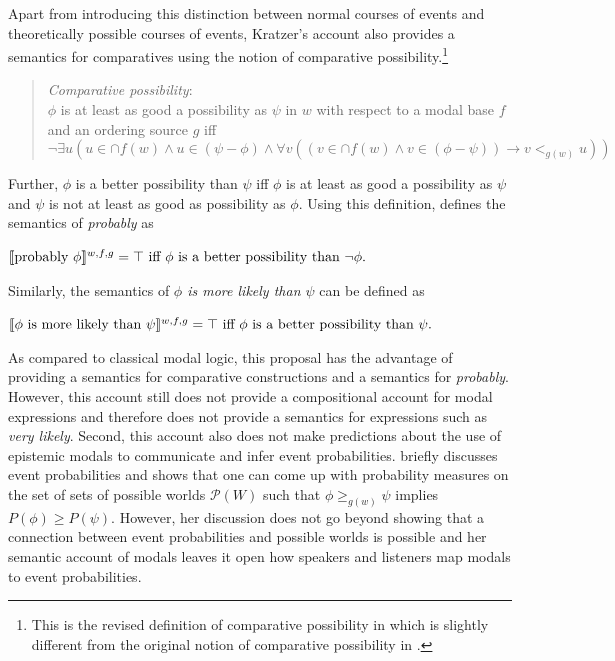 Apart from introducing this distinction between normal courses of events and theoretically possible courses of events, Kratzer's account also
provides a semantics for comparatives using the notion of comparative possibility.\footnote{This is the revised definition of comparative possibility
in \textcite[][Ch. 2]{Kratzer2012} which is slightly different from the original notion of comparative possibility in \textcite{Kratzer1981}.}
\begin{quote}
\noindent \textit{Comparative possibility}: \\
$\phi$ is at least as good a possibility as $\psi$ in $w$ with respect to a modal base $f$ and an ordering source $g$ iff 
$$\lnot \exists u ( u \in \cap f(w) \land u \in (\psi-\phi) \land \forall v (( v \in \cap f(w) \land v \in (\phi-\psi)) \rightarrow v <_{g(w)} u))$$
\end{quote}
\noindent	Further, $\phi$ is a better possibility than $\psi$ iff $\phi$ is at least as good a  possibility as $\psi$ and $\psi$ is 
not at least as good as possibility as $\phi$. Using this definition, \textcite{Kratzer1991} defines the semantics of \textit{probably} as
\begin{exe}
\ex $\llbracket\mbox{probably } \phi\rrbracket^{w,f,g}  = \top \mbox{ iff $\phi$ is a better possibility than $\lnot \phi$}.$ 
\end{exe}
\noindent Similarly, the semantics of \textit{$\phi$ is more likely than $\psi$} can be defined as 
\begin{exe}
\ex $\llbracket\phi \mbox{ is more likely than } \psi\rrbracket^{w,f,g}  = \top \mbox{ iff $\phi$ is a better possibility than $\psi$}.$ 
\end{exe}	

As compared to classical modal logic, this proposal has the advantage of providing a semantics for comparative constructions and
a semantics for \textit{probably}. However, this account still does not provide a compositional account for modal expressions and 
therefore does not provide a semantics for expressions such as \textit{very likely}. Second, this account also does not make predictions
about the use of epistemic modals to communicate and infer event probabilities. \textcite{Kratzer2012} briefly discusses event probabilities and shows that one
can come up with probability measures on the set of sets of possible worlds $\mathcal{P}(W)$ such that $\phi \ge_{g(w)} \psi$ implies $P(\phi) \ge P(\psi)$. 
However, her discussion does not go beyond showing that a connection between event probabilities and possible worlds is possible and 
her semantic account of modals leaves it open how speakers and listeners map modals to event probabilities.


